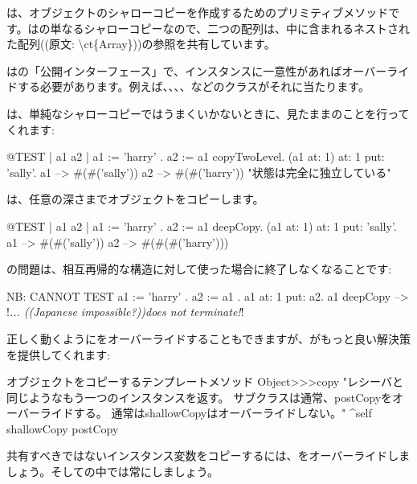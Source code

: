 \documentclass[a4paper,10pt,twoside]{book}
\begin{document}
は、オブジェクトのシャローコピーを作成するためのプリミティブメソッドです。はの単なるシャローコピーなので、二つの配列は、中に含まれるネストされた配列((原文: \textbackslash ct\{Array\}))の参照を共有しています。

はの「公開インターフェース」で、インスタンスに一意性があればオーバーライドする必要があります。例えば、、、、などのクラスがそれに当たります。

は、単純なシャローコピーではうまくいかないときに、見たままのことを行ってくれます:

\begin{code}{@TEST | a1 a2 |}
a1 := { { 'harry' } } .
a2 := a1 copyTwoLevel.
(a1 at: 1) at: 1 put: 'sally'.
a1 --> #(#('sally'))
a2 --> #(#('harry'))    "状態は完全に独立している"
\end{code}

は、任意の深さまでオブジェクトをコピーします。

\begin{code}{@TEST | a1 a2 |}
a1 := { { { 'harry' } } } .
a2 := a1 deepCopy.
(a1 at: 1) at: 1 put: 'sally'.
a1 --> #(#('sally'))
a2 --> #(#(#('harry')))
\end{code}

の問題は、相互再帰的な構造に対して使った場合に終了しなくなることです:

\begin{code}{NB: CANNOT TEST}
a1 := { 'harry' }.
a2 := { a1 }.
a1 at: 1 put: a2.
a1 deepCopy --> !\emph{... ((Japanese impossible?))does not terminate!}!
\end{code}

正しく動くようにをオーバーライドすることもできますが、がもっと良い解決策を提供してくれます:

\begin{method}{オブジェクトをコピーするテンプレートメソッド}
Object>>>copy
    "レシーバと同じようなもう一つのインスタンスを返す。
    サブクラスは通常、postCopyをオーバーライドする。
    通常はshallowCopyはオーバーライドしない。"
    ^self shallowCopy postCopy
\end{method}

共有すべきではないインスタンス変数をコピーするには、をオーバーライドしましょう。そしての中では常にしましょう。
\end{document}
